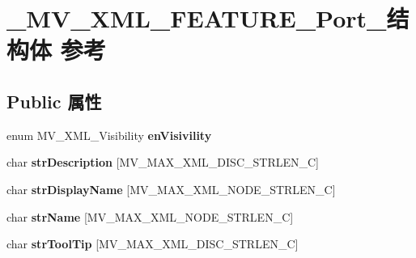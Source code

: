 \hypertarget{struct___m_v___x_m_l___f_e_a_t_u_r_e___port__}{}\section{\+\_\+\+M\+V\+\_\+\+X\+M\+L\+\_\+\+F\+E\+A\+T\+U\+R\+E\+\_\+\+Port\+\_\+结构体 参考}
\label{struct___m_v___x_m_l___f_e_a_t_u_r_e___port__}
\subsection*{Public 属性}
\begin{DoxyCompactItemize}
\item 
\mbox{\label{struct___m_v___x_m_l___f_e_a_t_u_r_e___port___a9bc68ae0457098ca6692ab01568a604d}} 
enum M\+V\+\_\+\+X\+M\+L\+\_\+\+Visibility {\bfseries en\+Visivility}
\item 
\mbox{\label{struct___m_v___x_m_l___f_e_a_t_u_r_e___port___a4a6a953433db1f886319af4db4d5c4bd}} 
char {\bfseries str\+Description} \mbox{[}M\+V\+\_\+\+M\+A\+X\+\_\+\+X\+M\+L\+\_\+\+D\+I\+S\+C\+\_\+\+S\+T\+R\+L\+E\+N\+\_\+C\mbox{]}
\item 
\mbox{\label{struct___m_v___x_m_l___f_e_a_t_u_r_e___port___a005d0c8c26aff9ace220f91ba222cfd3}} 
char {\bfseries str\+Display\+Name} \mbox{[}M\+V\+\_\+\+M\+A\+X\+\_\+\+X\+M\+L\+\_\+\+N\+O\+D\+E\+\_\+\+S\+T\+R\+L\+E\+N\+\_\+C\mbox{]}
\item 
\mbox{\label{struct___m_v___x_m_l___f_e_a_t_u_r_e___port___ae5a5ada4b2445f0d12f3049587d99436}} 
char {\bfseries str\+Name} \mbox{[}M\+V\+\_\+\+M\+A\+X\+\_\+\+X\+M\+L\+\_\+\+N\+O\+D\+E\+\_\+\+S\+T\+R\+L\+E\+N\+\_\+C\mbox{]}
\item 
\mbox{\label{struct___m_v___x_m_l___f_e_a_t_u_r_e___port___a659a6ac74e8fd31bdd46cb94de5419fc}} 
char {\bfseries str\+Tool\+Tip} \mbox{[}M\+V\+\_\+\+M\+A\+X\+\_\+\+X\+M\+L\+\_\+\+D\+I\+S\+C\+\_\+\+S\+T\+R\+L\+E\+N\+\_\+C\mbox{]}
\item 

\end{DoxyCompactItemize}
